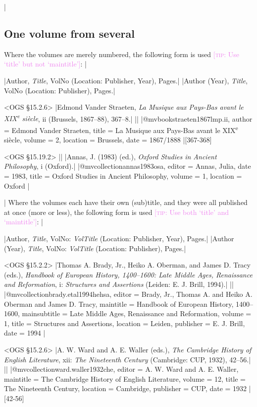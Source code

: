 \documentclass[extrafontsizes,11pt,a4paper,oneside]{memoir}
\newcommand*{\code}[1]{`\textsf{#1}'}
\newcommand*{\aside}[1]{\textcolor{violet}{[\textsc{tip:} #1]}}
\begin{document}
\todoc|
\subsection{One volume from several}

Where the volumes are merely numbered, the following form is used
\aside{Use \code{title} but not \code{maintitle}}:
|

\specs
|Author, \emph{Title}, VolNo (Location: Publisher, Year), Pages.|%
|Author (Year), \emph{Title}, VolNo (Location: Publisher), Pages.|

\bibexample<OGS \S15.2.6>
|Edmond Vander Straeten, \emph{La Musique aux Pays-Bas avant le XIX\textsuperscript{e} siècle}, ii (Brussels, 1867--88), 367--8.|%
||%
|@mvbook{straeten1867lmp.ii,
  author = {Edmond {Vander Straeten}},
  title = {La Musique aux Pays-Bas avant le XIX\textsuperscript{e} siècle},
  volume = {2},
  location = {Brussels},
  date = {1867/1888}
}|[367-368]

\bibexample<OGS \S15.19.2>
||%
|Annas, J. (1983) (ed.), \emph{Oxford Studies in Ancient Philosophy}, i (Oxford).|%
|@mvcollection{annas1983osa,
  editor = {Annas, Julia},
  date = {1983},
  title = {Oxford Studies in Ancient Philosophy},
  volume = {1},
  location = {Oxford}
}|

\todoc|
Where the volumes each have their own (sub)title,
and they were all published at once (more or less),
the following form is used \aside{Use both \code{title} and \code{maintitle}}:
|

\specs
|Author, \emph{Title}, VolNo: \emph{VolTitle} (Location: Publisher, Year), Pages.|%
|Author (Year), \emph{Title}, VolNo: \emph{VolTitle} (Location: Publisher), Pages.|

\bibexample<OGS \S15.2.2>
|Thomas A. Brady, Jr., Heiko A. Oberman, and James D. Tracy (eds.), \emph{Handbook of European History, 1400–1600: Late Middle Ages, Renaissance and Reformation}, i: \emph{Structures and Assertions} (Leiden: E. J. Brill, 1994).|%
||%
|@mvcollection{brady.etal1994hehsa,
  editor = {Brady, Jr., Thomas A. and Heiko A. Oberman and James D. Tracy},
  maintitle = {Handbook of European History, 1400–1600},
  mainsubtitle = {{Late} {Middle} {Ages,} {Renaissance} and {Reformation}},
  volume = {1},
  title = {Structures and Assertions},
  location = {Leiden},
  publisher = {E. J. Brill},
  date = {1994}
}|

\bibexample<OGS \S15.2.6>
|A. W. Ward and A. E. Waller (eds.), \emph{The Cambridge History of English Literature}, xii: \emph{The Nineteenth Century} (Cambridge: CUP, 1932), 42--56.|%
||%
|@mvcollection{ward.waller1932che,
  editor = {A. W. Ward and A. E. Waller},
  maintitle = {The Cambridge History of English Literature},
  volume = {12},
  title = {The Nineteenth Century},
  location = {Cambridge},
  publisher = {CUP},
  date = {1932}
}|[42-56]
\end{document}
